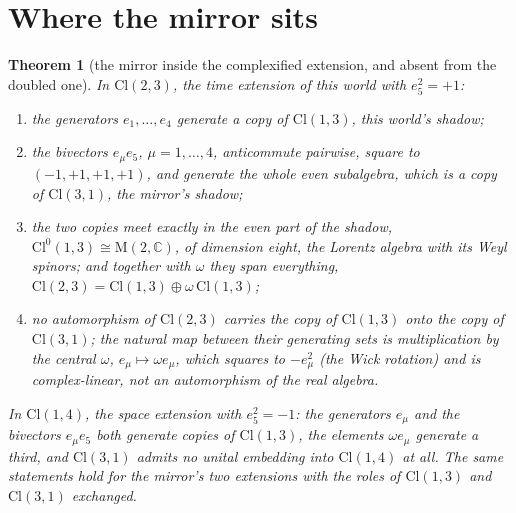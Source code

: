 \documentclass[11pt]{article}
\newtheorem{theorem}{Theorem}[section]
\theoremstyle{definition}
\newcommand{\Cl}{\mathrm{Cl}}
\newcommand{\C}{\mathbb{C}}
\newcommand{\Mat}{\mathrm{M}}
\begin{document}
\section{Where the mirror sits}\label{sec:mirror}

\begin{theorem}[the mirror inside the complexified extension, and absent from the doubled one]\label{thm:mirror}
In $\Cl(2,3)$, the time extension of this world with $e_{5}^{2} = +1$:
\begin{enumerate}
\item[(i)] the generators $e_{1}, \ldots, e_{4}$ generate a copy of $\Cl(1,3)$, this world's shadow;
\item[(ii)] the bivectors $e_{\mu}e_{5}$, $\mu = 1, \ldots, 4$, anticommute pairwise, square to $(-1, +1, +1, +1)$, and generate the whole even subalgebra, which is a copy of $\Cl(3,1)$, the mirror's shadow;
\item[(iii)] the two copies meet exactly in the even part of the shadow, $\Cl^{0}(1,3) \cong \Mat(2,\C)$, of dimension eight, the Lorentz algebra with its Weyl spinors; and together with $\omega$ they span everything, $\Cl(2,3) = \Cl(1,3) \oplus \omega\,\Cl(1,3)$;
\item[(iv)] no automorphism of $\Cl(2,3)$ carries the copy of $\Cl(1,3)$ onto the copy of $\Cl(3,1)$; the natural map between their generating sets is multiplication by the central $\omega$, $e_{\mu} \mapsto \omega e_{\mu}$, which squares to $-e_{\mu}^{2}$ (the Wick rotation) and is complex-linear, not an automorphism of the real algebra.
\end{enumerate}
In $\Cl(1,4)$, the space extension with $e_{5}^{2} = -1$: the generators $e_{\mu}$ and the bivectors $e_{\mu}e_{5}$ both generate copies of $\Cl(1,3)$, the elements $\omega e_{\mu}$ generate a third, and $\Cl(3,1)$ admits no unital embedding into $\Cl(1,4)$ at all. The same statements hold for the mirror's two extensions with the roles of $\Cl(1,3)$ and $\Cl(3,1)$ exchanged.
\end{theorem}
\end{document}
